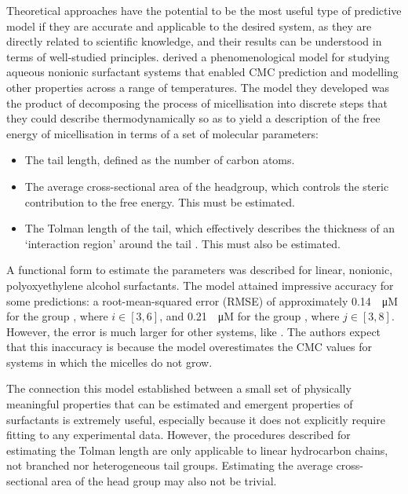 Theoretical approaches have the potential to be the most useful type of
predictive model if they are accurate and applicable to the desired system, as they are directly related to scientific knowledge, and their results can be understood in terms of well-studied principles.
\citet{puvvadaMolecularThermodynamicApproach1990} derived a phenomenological model for studying aqueous nonionic surfactant systems that enabled CMC prediction and modelling other properties across a range of temperatures. The model they developed was the product of decomposing the process of micellisation into discrete steps that they could describe thermodynamically so as to yield a description of the free energy of micellisation in terms of a set of molecular parameters:

\begin{itemize}
    \item The tail length, defined as the number of carbon atoms.
    \item The average cross-sectional area of the headgroup, which controls the
          steric contribution to the free energy. This must be estimated.
    \item The Tolman length of the tail, which effectively describes the
          thickness of an `interaction region' around the tail
          \cite{demiguelGibbsThermodynamicsSurface2021}. This must also be estimated.
\end{itemize}

A functional form to estimate the parameters was described for linear, nonionic, polyoxyethylene alcohol surfactants. The model attained impressive accuracy for some predictions: a root-mean-squared error (RMSE) of approximately \SI{0.14}{\log \micro M} for the group , where $i \in [3, 6]$, and \SI{0.21}{\log \micro M} for the group , where $j \in [3, 8]$.
However, the error is much larger for other systems, like . The
authors expect that this inaccuracy is because the model overestimates the CMC values for systems in which the micelles do not grow.

The connection this model established between a small set of physically meaningful properties that can be estimated and emergent properties of surfactants is extremely useful, especially because it does not explicitly require fitting to any experimental data. However, the procedures described for estimating the Tolman length are only applicable to linear hydrocarbon chains, not branched nor heterogeneous tail groups. Estimating the average cross-sectional area of the head group may also not be trivial.

